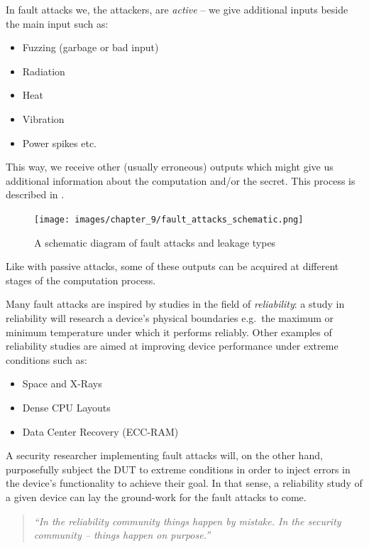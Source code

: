 In fault attacks we, the attackers, are \emph{active} -- we give additional inputs beside
the main input such as:
\begin{itemize}
	\item Fuzzing (garbage or bad input)
	\item Radiation
	\item Heat
	\item Vibration
	\item Power spikes etc.
\end{itemize}

This way, we receive other (usually erroneous) outputs which might give us
additional information about the computation and/or the secret. This process is
described in .

\begin{figure}[!ht]
	\centering
	\texttt{[image: images/chapter\_9/fault\_attacks\_schematic.png]}
	\caption{A schematic diagram of fault attacks and leakage types}\label{fig:fault_attacks_schematic}
\end{figure}

Like with passive attacks, some of these outputs can be acquired at different
stages of the computation process.

Many fault attacks are inspired by studies in the field of \emph{reliability}: a
study in reliability will research a device's physical boundaries e.g.\ the
maximum or minimum temperature under which it performs reliably. Other examples
of reliability studies are aimed at improving device performance under extreme
conditions such as:
\begin{itemize}
	\item Space and X-Rays
	\item Dense CPU Layouts
	\item Data Center Recovery (ECC-RAM)
\end{itemize}

A security researcher implementing fault attacks will, on the other hand,
purposefully subject the DUT to extreme conditions in order to inject errors in
the device's functionality to achieve their goal. In that sense, a reliability
study of a given device can lay the ground-work for the fault attacks to come.

\begin{quote}
	\textit{``In the reliability community things happen by mistake. In the security community -- things happen on purpose.''}
\end{quote}

